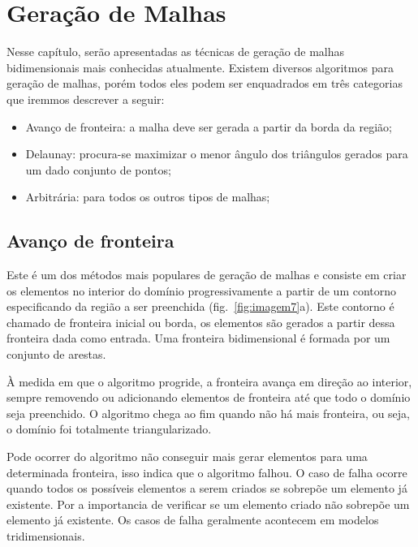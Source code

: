 \pagestyle{empty}
\cleardoublepage
\pagestyle{fancy}

\chapter{Geração de Malhas}\label{cap3}

Nesse capítulo, serão apresentadas as técnicas de geração de malhas bidimensionais mais conhecidas atualmente. Existem diversos algoritmos para geração de malhas, porém todos eles podem ser enquadrados em três categorias que iremmos descrever a seguir:

\begin{itemize}
  \item Avanço de fronteira: a malha deve ser gerada a partir da borda da região;

  \item Delaunay: procura-se maximizar o menor ângulo dos triângulos gerados para um dado conjunto de pontos;

  \item Arbitrária: para todos os outros tipos de malhas;
\end{itemize}

\section{Avanço de fronteira}

Este é um dos métodos mais populares de geração de malhas e consiste em criar os elementos no interior do domínio progressivamente a partir de um contorno especificando da região a ser preenchida (fig.~\ref{fig:imagem7}a). Este contorno é chamado de fronteira inicial ou borda, os elementos são gerados a partir dessa fronteira dada como entrada. Uma fronteira bidimensional é formada por um conjunto de arestas.

À medida em que o algoritmo progride, a fronteira avança em direção ao interior, sempre removendo ou adicionando elementos de fronteira até que todo o domínio seja preenchido. O algoritmo chega ao fim quando não há mais fronteira, ou seja, o domínio foi totalmente triangularizado. 

Pode ocorrer do algoritmo não conseguir mais gerar elementos para uma determinada fronteira, isso indica que o algoritmo falhou. O caso de falha ocorre quando todos os possíveis elementos a serem criados se sobrepõe um elemento já existente. Por a importancia de verificar se um elemento criado não sobrepõe um elemento já existente. Os casos de falha geralmente acontecem em modelos tridimensionais.

